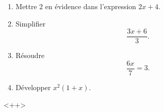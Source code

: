 
\begin{exercice}\label{exoSeconde-0065}

    \begin{enumerate}
        \item
            Mettre \( 2\) en évidence dans l'expression \( 2x+4\).
        \item
            Simplifier
            \begin{equation}
                \frac{ 3x+6 }{ 3 }.
            \end{equation}
        \item
            Résoudre
            \begin{equation}
                \frac{ 6x }{ 7 }=3.
            \end{equation}
        \item
            Développer \( x^2(1+x)\).
    \end{enumerate}
    <++>

\end{exercice}
